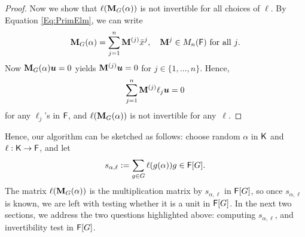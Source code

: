 \begin{proof}
  Now we show that $\ell(\mat M_G(\alpha))$ is not invertible for all
  choices of $\ell$. By Equation \eqref{Eq:PrimElm}, we can write 
  $$\mat M_G(\alpha) = \sum_{j = 1}^n \mat M^{(j)} \bar x^j, \quad 
\mat M^{j} \in M_{n}(\F) \text{~for all $j$}.$$ 
Now $\mat M_G(\alpha) \boldsymbol{u} =0$ yields $\mat M^{(j)}\boldsymbol{u} = 0$ for $j \in \lbrace 1, \ldots , n \rbrace$. Hence,
$$\sum_{j = 1}^n \mat M^{(j)} \ell_j \boldsymbol{u} = 0$$ for any 
$\ell_j$'s in ${\mathsf{F}}$, and $\ell(\mat M_G(\alpha))$ is not invertible for any~$\ell$.
\end{proof} 
Hence, our algorithm  can be sketched as follows: choose random
$\alpha$ in ${\mathsf{K}}$ and $\ell: {\mathsf{K}}\to{\mathsf{F}}$, and let 
$$s_{\alpha,\ell}:=\sum_{g \in G} \ell(g(\alpha))g \in {\mathsf{F}}[G].$$ The
matrix $\ell(\mat M_G (\alpha))$ is the multiplication matrix by
$s_{\alpha,\ell}$ in ${\mathsf{F}}[G]$, so once $s_{\alpha,\ell}$ is known, we
are left with testing whether it is a unit in ${\mathsf{F}}[G]$.
In the next two sections, we address the two questions highlighted above:
computing $s_{\alpha,\ell}$, and invertibility test in ${\mathsf{F}}[G]$.


